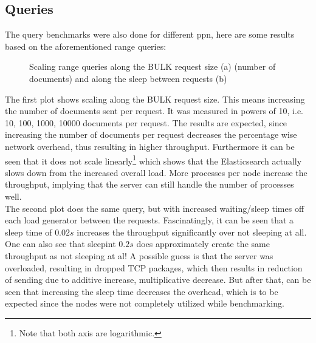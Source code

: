 \subsection{Queries}
The query benchmarks were also done for different ppn, here are some results based on the aforementioned range queries:

\begin{figure}[H]%
    \centering
    \qquad
    \caption{Scaling range queries along the BULK request size (a) (number of documents) and along the sleep between requests (b)}%
\end{figure}
The first plot shows scaling along the BULK request size. This means increasing the number of documents sent per request. It was measured in powers of 10, i.e. 10, 100, 1000, 10000 documents per request. The results are expected, since increasing the number of documents per request decreases the percentage wise network overhead, thus resulting in higher throughput. Furthermore it can be seen that it does not scale linearly\footnote{Note that both axis are logarithmic.} which shows that the Elasticsearch actually slows down from the increased overall load. More processes per node increase the throughput, implying that the server can still handle the number of processes well.\\

The second plot does the same query, but with increased waiting/sleep times off each load generator between the requests. Fascinatingly, it can be seen that a sleep time of $0.02s$ increases the throughput significantly over not sleeping at all. One can also see that sleepint $0.2s$ does approximately create the same throughput as not sleeping at al! A possible guess is that the server was overloaded, resulting in dropped TCP packages, which then results in reduction of sending due to additive increase, multiplicative decrease. But after that, can be seen that increasing the sleep time decreases the overhead, which is to be expected since the nodes were not completely utilized while benchmarking.


